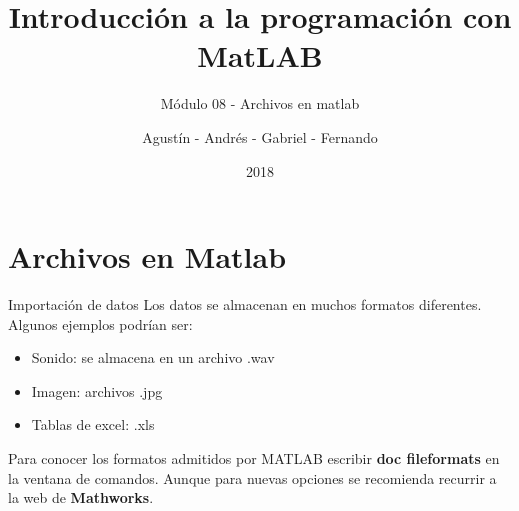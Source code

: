 \documentclass{bredelebeamer}
\title[Programación en MatLAB]{Introducción a la programación con MatLAB}
\subtitle{Módulo 08 - Archivos en matlab}
\author{Agustín - Andrés - Gabriel - Fernando\inst{1}}
\institute[UTN.BA]
{
  \inst{1}%
  Universidad Tecnológica Nacional\\
  Facultad Regional Buenos Aires
  }
\date{2018}
\begin{document}
\begin{frame}
  \titlepage 
\end{frame}



\section{Archivos en Matlab}

\begin{frame}{Importación de datos}
Los datos se almacenan en muchos formatos diferentes. Algunos ejemplos podrían ser:
\begin{itemize}
\item Sonido: se almacena en un archivo .wav
\item Imagen: archivos .jpg
\item Tablas de excel: .xls
\end{itemize}
Para conocer los formatos admitidos por MATLAB escribir \textbf{doc fileformats} en la ventana de comandos. Aunque para nuevas opciones se recomienda recurrir a la web de \textbf{Mathworks}.
\end{frame}
\end{document}
